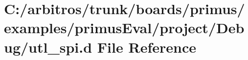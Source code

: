 \hypertarget{boards_2primus_2examples_2primus_eval_2project_2_debug_2utl__spi_8d}{\section{C\-:/arbitros/trunk/boards/primus/examples/primus\-Eval/project/\-Debug/utl\-\_\-spi.d File Reference}
\label{boards_2primus_2examples_2primus_eval_2project_2_debug_2utl__spi_8d}
}
